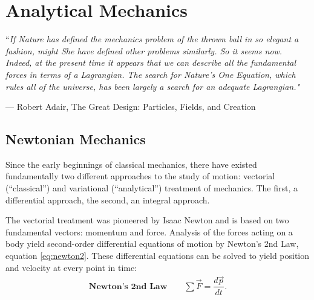 \chapter{Analytical Mechanics} \label{ch:analytical-mechanics}
\epigraph{``\itshape{If Nature has defined the mechanics problem of the thrown ball in so elegant a fashion, might She have defined other problems similarly. So it seems now. Indeed, at the present time it appears that we can describe all the fundamental forces in terms of a Lagrangian. The search for Nature's One Equation, which rules all of the universe, has been largely a search for an adequate Lagrangian.}"}{--- \textup{Robert Adair}, The Great Design: Particles, Fields, and Creation}


\section{Newtonian Mechanics}
Since the early beginnings of classical mechanics, there have existed fundamentally two different approaches to the study of motion: vectorial (``classical'') and variational (``analytical'') treatment of mechanics. The first, a differential approach, the second, an integral approach.

The vectorial treatment was pioneered by Isaac Newton and is based on two fundamental vectors: momentum and force. Analysis of the forces acting on a body yield second-order differential equations of motion by Newton's 2nd Law, equation \eqref{eq:newton2}. These differential equations can be solved to yield position and velocity at every point in time:
\begin{align}
\label{eq:newton2}
\textbf{Newton's 2nd Law} \qquad \sum{\vec{F}} = \dfrac{d \vec{p}}{dt}.
\end{align}


